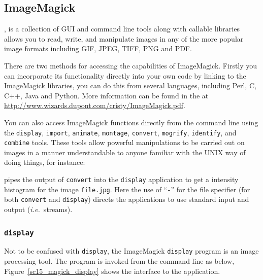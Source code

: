 \documentclass[twoside,11pt]{starlink}
\begin{document}
\subsection{ImageMagick\label{sc15_magick}}

,
is a collection of GUI and command line tools along with callable
libraries allows you to read, write, and manipulate images in any of
the more popular image formats including GIF, JPEG, TIFF, PNG and PDF.


There are two methods for accessing the capabilities of ImageMagick.
Firstly you can incorporate its functionality directly into your own
code by linking to the ImageMagick libraries, you can do this from
several languages, including Perl, C, C++, Java and Python. More
information can be found in the  at
\url{http://www.wizards.dupont.com/cristy/ImageMagick.pdf}.

You can also access ImageMagick functions directly from the command
line using the \texttt{display}, \texttt{import}, \texttt{animate}, \texttt{montage}, \texttt{convert}, \texttt{mogrify}, \texttt{identify}, and \texttt{combine} tools. These tools allow powerful manipulations to be carried
out on images in a manner understandable to anyone familiar with the
UNIX way of doing things, for instance:

\begin{terminalv}
\end{terminalv}

pipes the output of \texttt{convert} into the \texttt{display} application
to get a intensity histogram for the image \texttt{file.jpg}. Here the
use of ``\verb+-+'' for the file specifier (for both \texttt{convert} and
\texttt{display}) directs the applications to use standard input and
output (\emph{i.e.\ }streams).

\subsubsection{\texttt{display}}

Not to be confused with  \texttt{display}, the
ImageMagick \texttt{display} program is an image processing tool. The
program is invoked from the command line as below,
Figure~\ref{sc15_magick_display} shows the interface to the
application.
\end{document}
